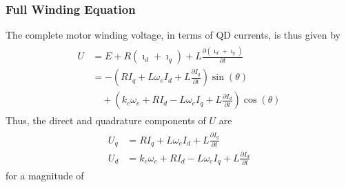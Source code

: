 \documentclass[12pt,a4paper,oneside,openany]{article}
\begin{document}
\subsubsection{Full Winding Equation}

The complete motor winding voltage, in terms of QD currents, is thus given by 
\begin{gather}
\begin{aligned}
U &= E + R (\imath_d + \imath_q) + L \frac{\partial (\imath_d + \imath_q)}{\partial t} \\
&= - ( R I_q + L \omega_e I_d + L \frac{\partial I_q}{\partial t})\sin \left( \theta \right) \\
&\quad + ( k_e \omega_e + R I_d - L \omega_e I_q + L \frac{\partial I_d}{\partial t}) \cos \left( \theta \right)
\end{aligned}
\end{gather}
Thus, the direct and quadrature components of $U$ are   
\begin{gather}
\begin{aligned}
U_q &= R I_q + L \omega_e I_d + L \frac{\partial I_q}{\partial t} \\
U_d &= k_e \omega_e + R I_d - L \omega_e I_q + L \frac{\partial I_d}{\partial t}
\end{aligned}
\end{gather}
for a magnitude of 
\end{document}
